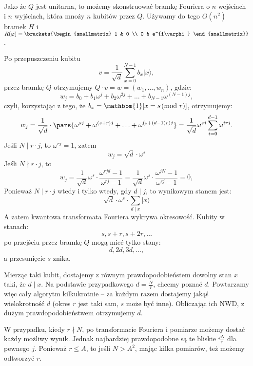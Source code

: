 Jako że \( Q \) jest unitarna, to możemy skonstruować bramkę Fouriera o \( n \) wejściach i \( n \) wyjściach, która mnoży \( n \) kubitów przez \( Q \).
Używamy do tego \( O(n^2) \) bramek \( H \) i \( R(\varphi) =
\brackets{\begin{smallmatrix}
    1 & 0 \\
    0 & e^{i\varphi}
\end{smallmatrix}}
\).

Po przepuszczeniu kubitu
\[
    v = \frac{1}{\sqrt{d}} \sum_{x=0}^{N-1} b_x |x\rangle,
\]
przez bramkę \( Q \) otrzymujemy \( Q \cdot v = w = (w_1, \ldots, w_n) \), gdzie:
\[
    w_j = b_0 + b_1 \omega^j + b_2 \omega^{2j} + \ldots + b_{N-1} \omega^{(N-1)j},
\]
czyli, korzystając z tego, że \( b_x = \mathbbm{1}[x = s \!\!\pmod{r}] \), otrzymujemy:
\[
    w_j = \frac{1}{\sqrt{d}} \cdot \pars{ \omega^{s j} + \omega^{(s + r) j} + \ldots + \omega^{(s + (d - 1)r) j} } = \frac{1}{\sqrt{d}} \omega^{s j} \sum_{i = 0}^{d - 1} \omega^{i r j}.
\]
Jeśli \( N \mid r \cdot j \), to \( \omega^{r j} = 1 \), zatem
\[
    w_j = \sqrt{d} \cdot \omega^{s}
\]
Jeśli \( N \nmid r \cdot j \), to
\[
    w_j = \frac{1}{\sqrt{d}} \omega^{s} \cdot \frac{\omega^{r j d} - 1}{\omega^{r j} - 1} = \frac{1}{\sqrt{d}} \omega^{s} \cdot \frac{\omega^{j N} - 1}{\omega^{r j} - 1} = 0,
\]
Ponieważ \( N \mid r \cdot j \) wtedy i tylko wtedy, gdy \( d \mid j \), to wynikowym stanem jest:
\[
    \sqrt{d} \cdot \omega^s \cdot \sum_{d \mid x} |x\rangle
\]
A zatem kwantowa transformata Fouriera wykrywa okresowość.
Kubity w stanach: \[ s, s + r, s + 2r, \ldots \] po przejściu przez bramkę \( Q \) mogą mieć tylko stany: \[ d, 2d, 3d, \ldots, \] a przesunięcie \( s \) znika.

Mierząc taki kubit, dostajemy z równym prawdopodobieństem dowolny stan \( x \) taki, że \( d \mid x \). Na podstawie przypadkowego \( d = \frac{N}{r} \), chcemy poznać \( d \).
Powtarzamy więc cały algorytm kilkukrotnie -- za każdym razem dostajemy jakąś wielokrotność \( d \) (okres \( r \) jest taki sam, \( s \) może być inne).
Obliczając ich NWD, z dużym prawdopodobieństwem otrzymujemy \( d \).

W przypadku, kiedy \( r \nmid N \), po transformacie Fouriera i pomiarze możemy dostać każdy możliwy wynik. Jednak najbardziej prawdopodobne są te bliskie \( \frac{jN}{r} \) dla pewnego \( j \).
Ponieważ \( r \leq A \), to jeśli \( N > A^2 \), mając kilka pomiarów, też możemy odtworzyć \( r \).